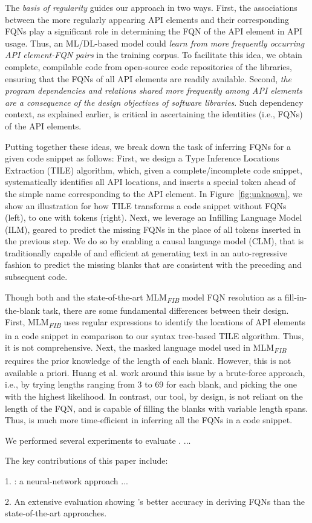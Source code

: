 
The {\em basis of regularity} guides our approach in two ways. First, the associations between the more regularly appearing API elements and their corresponding FQNs play a significant role in determining the FQN of the API element in API usage. Thus, an ML/DL-based model could {\em learn from more frequently occurring API element-FQN pairs} in the training corpus. To facilitate this idea, we obtain complete, compilable code from open-source code repositories of the libraries, ensuring that the FQNs of all API elements are readily available. Second, {\em the program dependencies and relations shared more frequently among API elements are a consequence of the design objectives of software libraries}. Such dependency context, as explained earlier, is critical in ascertaining the identities (i.e., FQNs) of the API elements.


Putting together these ideas, we break down the task of inferring FQNs for a given code snippet as follows: First, we design a Type Inference Locations Extraction (TILE) algorithm, which, given a complete/incomplete code snippet, systematically identifies all API locations, and inserts a special \code{[blank]} token ahead of the simple name corresponding to the API element. In Figure~\ref{fig:unknown}, we show an illustration for how TILE transforms a code snippet without FQNs (left), to one with \code{[blank]} tokens (right). Next, we leverage an Infilling Language Model~\cite{} (ILM), geared to predict the missing FQNs in the place of all \code{[blank]} tokens inserted in the previous step. We do so by enabling a causal language model (CLM), that is traditionally capable of and efficient at generating text in an auto-regressive fashion to predict the missing blanks that are consistent with the preceding and subsequent code.

Though both \tool and the state-of-the-art MLM\textsubscript{\textit{FIB}} model FQN resolution as a fill-in-the-blank task, there are some fundamental differences between their design. First, MLM\textsubscript{\textit{FIB}} uses regular expressions to identify the locations of API elements in a code snippet in comparison to our syntax tree-based TILE algorithm. Thus, it is not comprehensive. Next, the masked language model used in MLM\textsubscript{\textit{FIB}} requires the prior knowledge of the length of each blank. However, this is not available a priori. Huang et al. work around this issue by a brute-force approach, i.e., by trying lengths ranging from 3 to 69 for each blank, and picking the one with the highest likelihood. In contrast, our tool, by design, is not reliant on the length of the FQN, and is capable of filling the blanks with variable length spans. Thus, \tool is much more time-efficient in inferring all the FQNs in a code snippet.


We performed several experiments to evaluate {\tool}. ...

The key contributions of this paper include:

1. {\tool}: a neural-network approach ...

2. An extensive evaluation showing {\tool}'s better accuracy in
deriving FQNs than the state-of-the-art approaches.
